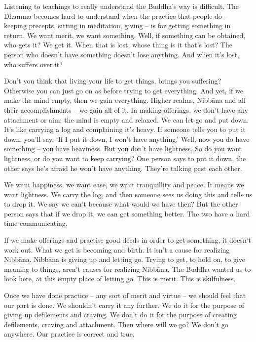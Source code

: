 Listening to teachings to really understand the Buddha's way is difficult. The Dhamma becomes hard to understand when the practice that people do -- keeping precepts, sitting in meditation, giving -- is for getting something in return. We want merit, we want something. Well, if something can be obtained, who gets it? We get it. When that is lost, whose thing is it that's lost? The person who doesn't have something doesn't lose anything. And when it's lost, who suffers over it?

Don't you think that living your life to get things, brings you suffering? Otherwise you can just go on as before trying to get everything. And yet, if we make the mind empty, then we gain everything. Higher realms, Nibb\=ana and all their accomplishments -- we gain all of it. In making offerings, we don't have any attachment or aim; the mind is empty and relaxed. We can let go and put down. It's like carrying a log and complaining it's heavy. If someone tells you to put it down, you'll say, `If I put it down, I won't have anything.' Well, now you do have something -- you have heaviness. But you don't have lightness. So do you want lightness, or do you want to keep carrying? One person says to put it down, the other says he's afraid he won't have anything. They're talking past each other.

We want happiness, we want ease, we want tranquillity and peace. It means we want lightness. We carry the log, and then someone sees us doing this and tells us to drop it. We say we can't because what would we have then? But the other person says that if we drop it, we can get something better. The two have a hard time communicating.

If we make offerings and practise good deeds in order to get something, it doesn't work out. What we get is becoming and birth. It isn't a cause for realizing Nibb\=ana. Nibb\=ana is giving up and letting go. Trying to get, to hold on, to give meaning to things, aren't causes for realizing Nibb\=ana. The Buddha wanted us to look here, at this empty place of letting go. This is merit. This is skilfulness.

Once we have done practice -- any sort of merit and virtue -- we should feel that our part is done. We shouldn't carry it any further. We do it for the purpose of giving up defilements and craving. We don't do it for the purpose of creating defilements, craving and attachment. Then where will we go? We don't go anywhere. Our practice is correct and true.

